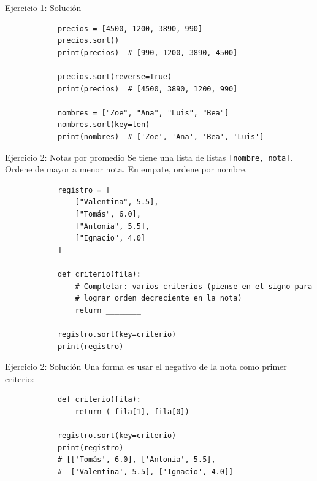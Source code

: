 \documentclass{beamer}
\begin{document}
    \begin{frame}[fragile, t]{Ejercicio 1: Solución}
        \begin{verbatim}
            precios = [4500, 1200, 3890, 990]
            precios.sort()
            print(precios)  # [990, 1200, 3890, 4500]

            precios.sort(reverse=True)
            print(precios)  # [4500, 3890, 1200, 990]

            nombres = ["Zoe", "Ana", "Luis", "Bea"]
            nombres.sort(key=len)
            print(nombres)  # ['Zoe', 'Ana', 'Bea', 'Luis']
        \end{verbatim}
    \end{frame}

    \begin{frame}[fragile, t]{Ejercicio 2: Notas por promedio}
        Se tiene una lista de listas \texttt{[nombre, nota]}.
        Ordene de mayor a menor nota. En empate, ordene por nombre.
        \begin{verbatim}
            registro = [
                ["Valentina", 5.5],
                ["Tomás", 6.0],
                ["Antonia", 5.5],
                ["Ignacio", 4.0]
            ]

            def criterio(fila):
                # Completar: varios criterios (piense en el signo para
                # lograr orden decreciente en la nota)
                return ________

            registro.sort(key=criterio)
            print(registro)
        \end{verbatim}
    \end{frame}

    \begin{frame}[fragile, t]{Ejercicio 2: Solución}
        Una forma es usar el negativo de la nota como primer criterio:
        \begin{verbatim}
            def criterio(fila):
                return (-fila[1], fila[0])

            registro.sort(key=criterio)
            print(registro)
            # [['Tomás', 6.0], ['Antonia', 5.5],
            #  ['Valentina', 5.5], ['Ignacio', 4.0]]
        \end{verbatim}
    \end{frame}
\end{document}
